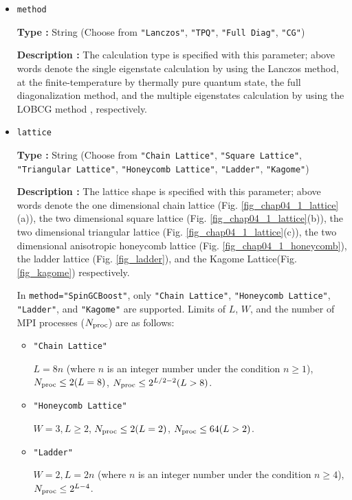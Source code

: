 \begin{itemize}
\item \verb|method|
  
{\bf Type :} String (Choose from \verb|"Lanczos"|, \verb|"TPQ"|, \verb|"Full Diag"|, \verb|"CG"|)

{\bf Description :} The calculation type is specified with this parameter;
above words denote 
the single eigenstate calculation by using the Lanczos method,
at the finite-temperature by thermally pure quantum state,
the full diagonalization method,
and the multiple eigenstates calculation by using the LOBCG method
\cite{doi:10.1137/S1064827500366124,transactionJSCES2006},
respectively.

\item \verb|lattice|

{\bf Type :} String (Choose from \verb|"Chain Lattice"|, \verb|"Square Lattice"|, 
\verb|"Triangular Lattice"|, \verb|"Honeycomb Lattice"|, \verb|"Ladder"|, \verb|"Kagome"|)

{\bf Description :} The lattice shape is specified with this parameter;
above words denote
the one dimensional chain lattice (Fig. \ref{fig_chap04_1_lattice}(a)), 
the two dimensional square lattice (Fig. \ref{fig_chap04_1_lattice}(b)),
the two dimensional triangular lattice (Fig. \ref{fig_chap04_1_lattice}(c)),
the two dimensional anisotropic honeycomb lattice (Fig. \ref{fig_chap04_1_honeycomb}),
the ladder lattice (Fig. \ref{fig_ladder}),
and
the Kagome Lattice(Fig. \ref{fig_kagome})
respectively.

In \verb|method="SpinGCBoost"|,
only \verb|"Chain Lattice"|, \verb|"Honeycomb Lattice"|, 
\verb|"Ladder"|, and \verb|"Kagome"| are supported.
Limits of $L$, $W$, and the number of MPI processes ($N_{\rm proc}$) are as follows:

\begin{itemize}

  \item \verb|"Chain Lattice"|

    $L = 8n$ (where $n$ is an integer number under the condition  $n\geq1$),
    $N_{\rm proc} \leq 2(L=8)$, $N_{\rm proc} \leq 2^{L/2-2}(L>8)$.
    
  \item \verb|"Honeycomb Lattice"|

    $W=3, L \geq 2$, $N_{\rm proc} \leq 2(L=2)$, $N_{\rm proc} \leq 64(L>2)$.

  \item \verb|"Ladder"|

    $W=2, L = 2n$ (where $n$ is an integer number under the condition  $n\geq4$),
    $N_{\rm proc} \leq 2^{L-4}$.


\end{itemize}
\end{itemize}
